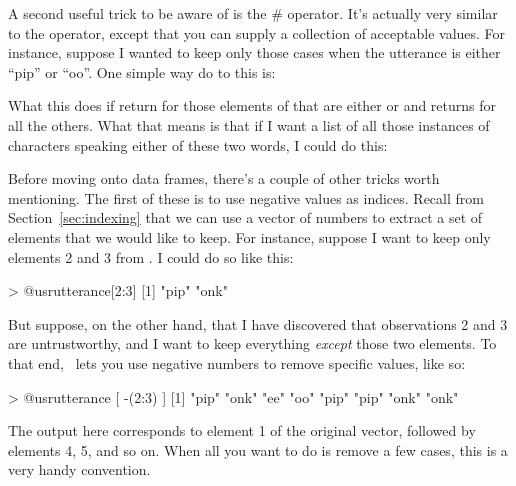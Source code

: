 
A second useful trick to be aware of is the \rtextverb#%
operator. It's actually very similar to the \rtext{==} operator, except that you can supply a collection of acceptable values. For instance, suppose I wanted to keep only those cases when the utterance is either ``pip'' or ``oo''. One simple way do to this is:
What this does if return  for those elements of  that are either  or  and returns  for all the others. What that means is that if I want a list of all those instances of characters speaking either of these two words, I could do this:





Before moving onto data frames, there's a couple of other tricks worth mentioning. The first of these is to use negative values as indices. Recall from Section~\ref{sec:indexing} that we can use a vector of numbers to extract a set of elements that we would like to keep. For instance, suppose I want to keep only elements 2 and 3 from . I could do so like this:
\begin{rblock1}
> @usr{utterance[2:3]}
[1] "pip" "onk"
\end{rblock1}
But suppose, on the other hand, that I have discovered that observations 2 and 3 are untrustworthy, and I want to keep everything {\it except} those two elements. To that end, \R\ lets you use negative numbers to remove specific values, like so:
\begin{rblock1}
> @usr{utterance [ -(2:3) ]}
[1] "pip" "onk" "ee"  "oo"  "pip" "pip" "onk" "onk"
\end{rblock1}
The output here corresponds to element 1 of the original vector, followed by elements 4, 5, and so on. When all you want to do is remove a few cases, this is a very handy convention. 





